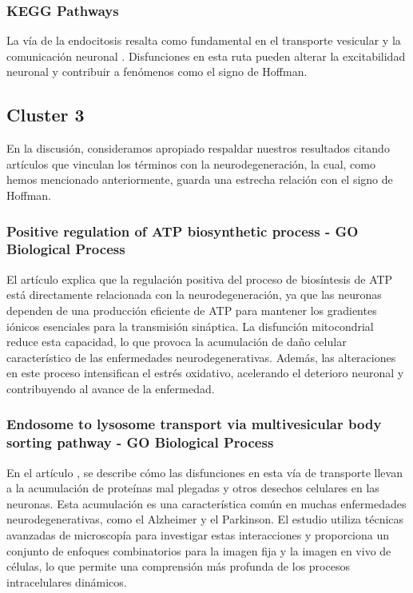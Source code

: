 \subsubsection{KEGG Pathways}

La vía de la endocitosis resalta como fundamental en el transporte vesicular y la comunicación neuronal \cite{Chanaday8209}. Disfunciones en esta ruta pueden alterar la excitabilidad neuronal y contribuir a fenómenos como el signo de Hoffman.




\subsection{Cluster 3}

En la discusión, consideramos apropiado respaldar nuestros resultados citando artículos que vinculan los términos con la neurodegeneración, la cual, como hemos mencionado anteriormente, guarda una estrecha relación con el signo de Hoffman.

\subsubsection{Positive regulation of ATP biosynthetic process - GO Biological Process}
El artículo \cite{Bonvento2017} explica que la regulación positiva del proceso de biosíntesis de ATP está directamente relacionada con la neurodegeneración, ya que las neuronas dependen de una producción eficiente de ATP para mantener los gradientes iónicos esenciales para la transmisión sináptica. La disfunción mitocondrial reduce esta capacidad, lo que provoca la acumulación de daño celular característico de las enfermedades neurodegenerativas. Además, las alteraciones en este proceso intensifican el estrés oxidativo, acelerando el deterioro neuronal y contribuyendo al avance de la enfermedad. 

\subsubsection{Endosome to lysosome transport via multivesicular body sorting pathway - GO Biological Process}
En el artículo \cite{Mulligan2023}, se describe cómo las disfunciones en esta vía de transporte llevan a la acumulación de proteínas mal plegadas y otros desechos celulares en las neuronas. Esta acumulación es una característica común en muchas enfermedades neurodegenerativas, como el Alzheimer y el Parkinson. El estudio utiliza técnicas avanzadas de microscopía para investigar estas interacciones y proporciona un conjunto de enfoques combinatorios para la imagen fija y la imagen en vivo de células, lo que permite una comprensión más profunda de los procesos intracelulares dinámicos.


